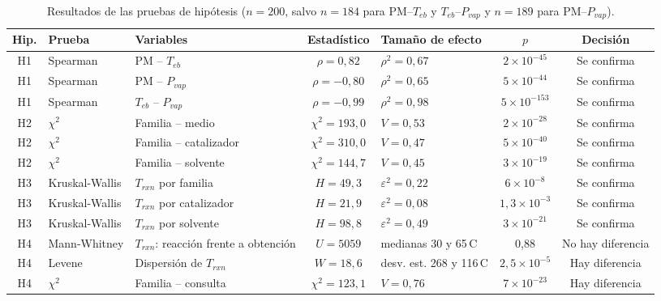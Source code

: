 \documentclass[twoside,twocolumn,10pt]{article}
\begin{document}
\begin{table}[!t]
	\centering
	\footnotesize
	\begin{tabular}{|c|l|l|c|l|c|c|}
		\hline
		\textbf{Hip.} & \textbf{Prueba} & \textbf{Variables} & \textbf{Estad\'istico} & \textbf{Tama\~no de efecto} & \textbf{$p$} & \textbf{Decisi\'on} \\
		\hline
		H1 & Spearman & PM -- $T_{eb}$ & $\rho=0{,}82$ & $\rho^2=0{,}67$ & $2\times10^{-45}$ & Se confirma \\
		H1 & Spearman & PM -- $P_{vap}$ & $\rho=-0{,}80$ & $\rho^2=0{,}65$ & $5\times10^{-44}$ & Se confirma \\
		H1 & Spearman & $T_{eb}$ -- $P_{vap}$ & $\rho=-0{,}99$ & $\rho^2=0{,}98$ & $5\times10^{-153}$ & Se confirma \\
		H2 & $\chi^2$ & Familia -- medio & $\chi^2=193{,}0$ & $V=0{,}53$ & $2\times10^{-28}$ & Se confirma \\
		H2 & $\chi^2$ & Familia -- catalizador & $\chi^2=310{,}0$ & $V=0{,}47$ & $5\times10^{-40}$ & Se confirma \\
		H2 & $\chi^2$ & Familia -- solvente & $\chi^2=144{,}7$ & $V=0{,}45$ & $3\times10^{-19}$ & Se confirma \\
		H3 & Kruskal-Wallis & $T_{rxn}$ por familia & $H=49{,}3$ & $\varepsilon^2=0{,}22$ & $6\times10^{-8}$ & Se confirma \\
		H3 & Kruskal-Wallis & $T_{rxn}$ por catalizador & $H=21{,}9$ & $\varepsilon^2=0{,}08$ & $1{,}3\times10^{-3}$ & Se confirma \\
		H3 & Kruskal-Wallis & $T_{rxn}$ por solvente & $H=98{,}8$ & $\varepsilon^2=0{,}49$ & $3\times10^{-21}$ & Se confirma \\
		H4 & Mann-Whitney & $T_{rxn}$: reacci\'on frente a obtenci\'on & $U=5059$ & medianas 30 y 65\,\textdegree C & 0,88 & No hay diferencia \\
		H4 & Levene & Dispersi\'on de $T_{rxn}$ & $W=18{,}6$ & desv. est. 268 y 116\,\textdegree C & $2{,}5\times10^{-5}$ & Hay diferencia \\
		H4 & $\chi^2$ & Familia -- consulta & $\chi^2=123{,}1$ & $V=0{,}76$ & $7\times10^{-23}$ & Hay diferencia \\
		\hline
	\end{tabular}
	\captionsetup{width=\textwidth, justification=justified}
	\caption{Resultados de las pruebas de hip\'otesis ($n=200$, salvo $n=184$ para PM--$T_{eb}$ y $T_{eb}$--$P_{vap}$ y $n=189$ para PM--$P_{vap}$).}
	\label{tab:hipotesis}
\end{table}
\end{document}
